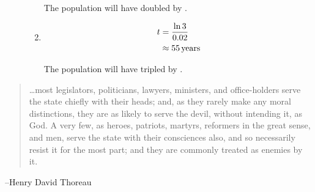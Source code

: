 \documentclass{exam}
\begin{document}
\begin{description}
\begin{enumerate}[a]
            The population will have doubled by .

          \item 
            \begin{align*}
              t & = \frac{\ln 3}{0.02} \\
                & \approx \unit[55]{years} \\
            \end{align*}

            The population will have tripled by .
        \end{enumerate}
    \end{description}

  \else
    \vspace{1 cm}
    \begin{quote}
      \begin{em}
        \ldots most legislators, politicians, lawyers, ministers, and office-holders serve the state chiefly with their
        heads; and, as they rarely make any moral distinctions, they are as likely to serve the devil, without intending
        it, as God. A very few, as heroes, patriots, martyrs, reformers in the great sense, and men, serve the state with
        their consciences also, and so necessarily resist it for the most part; and they are commonly treated as enemies
        by it.      
      \end{em}
    \end{quote}
    \hspace{1 cm} --Henry David Thoreau
  \fi



\end{document}
